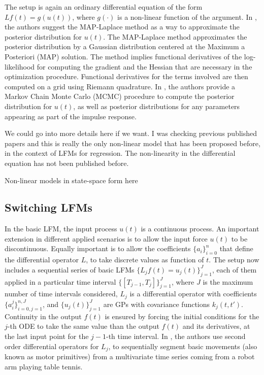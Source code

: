\documentclass[journal]{IEEEtran}
\newcommand{\mauricio}[1]{{\color{blue}#1}}
\newcommand{\simo}[1]{{\color{red}#1}}
\begin{document}
The setup is again an ordinary differential equation of the form $Lf(t)=g(u(t))$, where $g(\cdot)$ is a non-linear function
of the argument. In \cite{Lawrence:gpsim2007a, Gao:latent08}, the authors suggest the MAP-Laplace method
\cite{Bishop:PRML06} as a way to approximate the posterior distribution for $u(t)$. The MAP-Laplace method approximates
the posterior distribution by a
Gaussian distribution centered at the Maximum a Posteriori (MAP) solution. The method implies functional derivatives of the
log-likelihood for computing the gradient and the Hessian that are necessary in the optimization procedure. Functional
derivatives for the terms involved are then computed on a grid using Riemann quadrature. In \cite{Titsias:BMC:2012}, the
authors provide a Markov Chain Monte Carlo (MCMC) procedure to compute the posterior distribution for $u(t)$, as well
as posterior distributions for any parameters appearing as part of the impulse response.

\mauricio{We could go into more details here if we want. I was checking previous published papers and this is really
the only non-linear model that has been proposed before, in the context of LFMs for regression. The non-linearity in the
differential equation has not been published before}.


\simo{Non-linear models in state-space form here}


\subsection{Switching LFMs}

In the basic LFM, the input process $u(t)$ is a continuous process. An important extension in different applied scenarios
is to allow the input force $u(t)$ to be discontinuous. Equally important is to allow the coefficients $\{a_i\}_{i=0}^n$ that
define the differential operator $L$, to take discrete values as function of $t$. The setup now includes a sequential
series of basic LFMs $\{L_jf(t) = u_j(t)\}_{j=1}^J$, each of them applied in a particular time interval
$\{[T_{j-1}, T_j]\}_{j=1}^J$, where $J$ is the maximum number of time intervals considered, $L_j$ is a differential operator
with coefficients $\{a_i^j\}_{i=0,j=1}^{n, J}$, and $\{u_j(t)\}_{j=1}^J$ are GPs with covariance functions $k_j(t,t')$.
Continuity in the output $f(t)$ is ensured by forcing the initial conditions for the $j$-th ODE to take the same value
than the output $f(t)$ and its derivatives, at the last input point for the $j-1$-th time interval.
In \cite{Alvarez:switched11}, the authors use second order differential operators for $L_j$, to sequentially segment
basic movements (also known as motor primitives) from a multivariate time series coming from a robot arm playing table
tennis.
\end{document}
